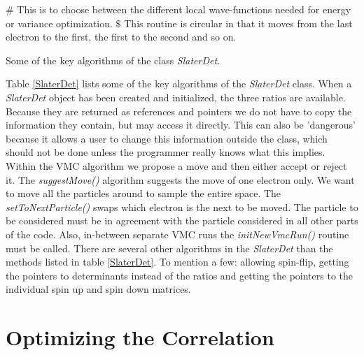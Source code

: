 \begin{table}[hbtp]
{\footnotesize${\#}$ This is to choose between the
  different local wave-functions needed for energy or variance
  optimization.}
{\footnotesize${\$}$ This routine is circular in that it
  moves from the last electron to the first, the first to the second
  and so on.}
\caption{Some of the key algorithms of the class \emph{SlaterDet}.}
\label{SlaterDet}
\end{table}

Table \ref{SlaterDet} lists some of the key algorithms of the
\emph{SlaterDet} class. When a \emph{SlaterDet} object has been
created and initialized, the three ratios are available. Because they
are returned as references 
and pointers we do not have to copy the information they contain, but
may access it directly. This can also be 'dangerous' because it allows a
user to change this information outside the class, which should not be
done unless the programmer really knows what this implies. Within the
VMC algorithm we 
propose a move and then either accept or reject it. The
\emph{suggestMove()} algorithm suggests the move of one
electron only. We want to move all the particles around to sample the
entire space. The \emph{setToNextParticle()} swaps which electron is
the next to be moved. The particle to be considered must be in agreement
with the particle considered in all other parts of the code. Also,
in-between separate VMC runs the \emph{initNewVmcRun()} routine must
be called.
\newline
%
\newline
There are several other algorithms in the \emph{SlaterDet} than the
methods listed in table \ref{SlaterDet}. To mention a few: allowing
spin-flip, getting the pointers to determinants instead of the ratios
and getting the pointers to the individual spin up and spin down
matrices. 


\section{Optimizing the Correlation}
\label{OptimizingTheCorrelation}

